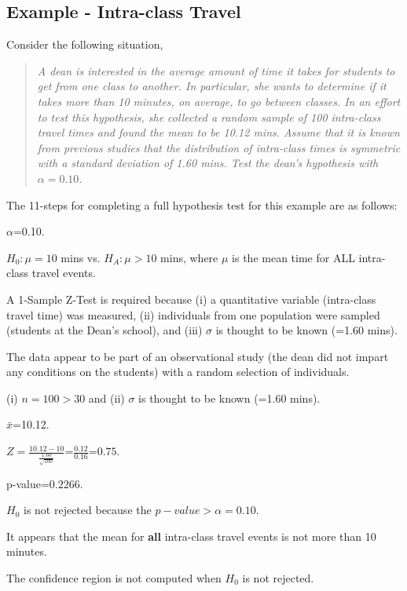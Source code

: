 \documentclass[10pt,openany]{book}\usepackage[]{graphicx}\usepackage[]{color}
\begin{document}
\subsection{Example - Intra-class Travel}
\vspace{-8pt}
Consider the following situation,
\begin{quote}
\vspace{-8pt}
\textsl{A dean is interested in the average amount of time it takes for students to get from one class to another.  In particular, she wants to determine if it takes more than 10 minutes, on average, to go between classes.  In an effort to test this hypothesis, she collected a random sample of 100 intra-class travel times and found the mean to be 10.12 mins.  Assume that it is known from previous studies that the distribution of intra-class times is symmetric with a standard deviation of 1.60 mins.  Test the dean's hypothesis with $\alpha=0.10$.}
\end{quote}

The 11-steps  for completing a full hypothesis test for this example are as follows:
\vspace{-12pt}
\begin{Enumerate}
  \item $\alpha$=0.10.
  \item $H_{0}:\mu=10$ mins vs. $H_{A}:\mu>10$ mins, where $\mu$ is the mean time for ALL intra-class travel events.
  \item A 1-Sample Z-Test is required because (i) a quantitative variable (intra-class travel time) was measured, (ii) individuals from one population were sampled (students at the Dean's school), and (iii) $\sigma$ is thought to be known (=1.60 mins).
  \item The data appear to be part of an observational study (the dean did not impart any conditions on the students) with a random selection of individuals.
  \item (i) $n=100>30$ and (ii) $\sigma$ is thought to be known (=1.60 mins).
  \item $\bar{x}$=10.12.
  \item $Z=\frac{10.12-10}{\frac{1.60}{\sqrt{100}}}$=$\frac{0.12}{0.16}$=$0.75$.
  \item p-value=$0.2266$.
  \item $H_{0}$ is not rejected because the $p-value >\alpha=0.10$.
  \item It appears that the mean for \textbf{all} intra-class travel events is not more than 10 minutes.
  \item The confidence region is not computed when $H_{0}$ is not rejected.
\end{Enumerate}
\end{document}
